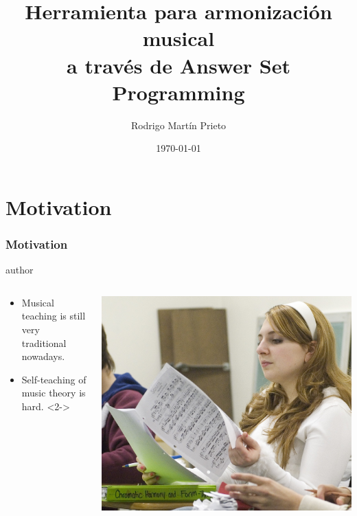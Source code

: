 \documentclass[english,handout]{beamer}
\title[Harmonization through ASP]{Herramienta para armonización musical\\a través de Answer Set Programming}
\author[Rodrigo Martín Prieto]{Rodrigo Martín Prieto}
\institute[UDC] {
Universidade da Coruña \\ %
\medskip
\textit{r.martin@udc.es} %
}
\date{\today} %
\begin{document}
\begin{frame}
\titlepage %
\end{frame}


\section{Motivation}
\begin{frame}
	\frametitle{Motivation}
			\begin{beamercolorbox}[leftskip=8cm,center,wd=0.7\textwidth]{author}
			\begin{columns}[T]
			\begin{column}{.60\textwidth}%
				\begin{itemize}
						\item \alert{Musical teaching} is still very traditional nowadays.
						\item Self-teaching of \alert{music theory} is hard.
						<2->
				\end{itemize}
			\end{column}
			\begin{column}{.39\textwidth}%
			\includegraphics[width=\linewidth]{imagenes/student-in-class.jpg}
			\end{column}
			\end{columns}
			\end{beamercolorbox}

\end{frame}
\end{document}
